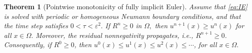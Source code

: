 \documentclass[final, 3p, times]{elsarticle}%
\newcommand{\eps}{\varepsilon}
\newcommand{\dt}{\tau}
\newtheorem{theorem}{Theorem}[section]
\begin{document}
\begin{theorem}[Pointwise monotonicity of fully implicit Euler]\label{thm:FIE-monotone}
Assume that \eqref{eq:IE} is solved with periodic or homogeneous Neumann boundary conditions, and that the time step satisfies
$0<\dt<\eps^2.$ If $R^n\ge0$ in $\Omega,$
then $u^{n+1}(x)\ge u^n(x)$ for all $x\in\Omega.$
Moreover, the residual nonnegativity propagates, i.e., $R^{n+1}\ge0$.
Consequently, if \(R^0\ge0\), then
$u^0(x)\le u^1(x)\le u^2(x)\le\cdots$, for all $x\in\Omega.$
\end{theorem}
\end{document}
